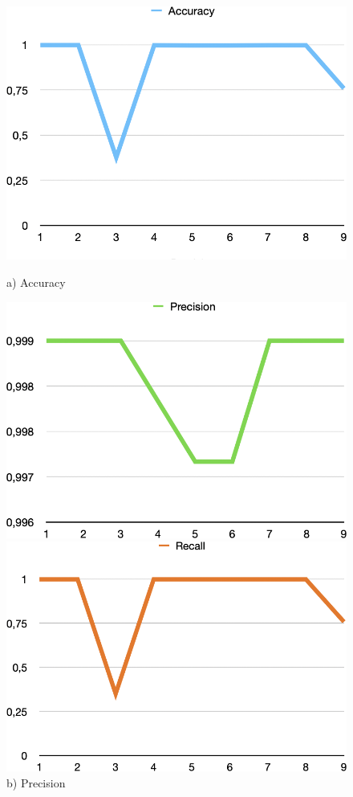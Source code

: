 \begin{figure}[H]
  \centering
  \begin{minipage}{0.3\textwidth}
      \centering
      \includegraphics[width=\textwidth]{assets/202}
      \caption*{a) Accuracy}
  \end{minipage}
  \hfill
  \begin{minipage}{0.3\textwidth}
      \centering
      \includegraphics[width=\textwidth]{assets/203}
      \caption*{b) Precision}
  \end{minipage}
  \hfill
  \begin{minipage}{0.3\textwidth}
      \centering
      \includegraphics[width=\textwidth]{assets/204}

\end{minipage}
\end{figure}
